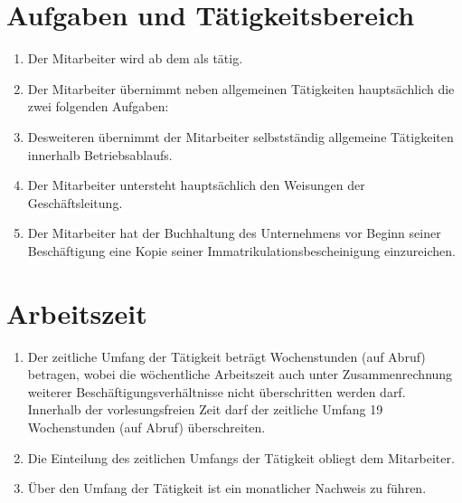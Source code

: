\documentclass[twoside,a4paper]{scrreprt}
\begin{document}
\newpage
\section{Aufgaben und Tätigkeitsbereich}
    \centerline{\textbf{}}
    
    \centerline{ }
    \begin{enumerate}[label=(\alph*)]
    	\item Der Mitarbeiter wird ab dem \Beginn \white als \Stellenbezeichnung \white tätig.
    	\item Der Mitarbeiter übernimmt neben allgemeinen Tätigkeiten hauptsächlich die zwei folgenden Aufgaben:
    	\Aufgabe
    	\item Desweiteren übernimmt der Mitarbeiter selbstständig allgemeine Tätigkeiten innerhalb Betriebsablaufs.
    	\item Der Mitarbeiter untersteht hauptsächlich den Weisungen der Geschäftsleitung.
    	\ifdefined\istStudent \item Der Mitarbeiter hat der Buchhaltung des Unternehmens vor Beginn seiner Beschäftigung eine Kopie seiner Immatrikulationsbescheinigung einzureichen.
    	\fi
    \end{enumerate}
    
\newpage      
\section{Arbeitszeit}
    
    \centerline{ }
    \begin{enumerate}[label=(\alph*)]
    	\ifdefined\stundenbasis\item Der zeitliche Umfang der Tätigkeit beträgt \Stunden Wochenstunden (auf Abruf) betragen, wobei die wöchentliche Arbeitszeit auch unter Zusammenrechnung weiterer Beschäftigungsverhältnisse nicht überschritten werden darf. Innerhalb der vorlesungsfreien Zeit darf der zeitliche Umfang 19 Wochenstunden (auf Abruf) überschreiten.
    	\fi
    	\ifdefined\pauschal
    	\item Die Einteilung des zeitlichen Umfangs der Tätigkeit obliegt dem Mitarbeiter.
    	\fi
    	\item Über den Umfang der Tätigkeit ist ein monatlicher Nachweis zu führen.
    \end{enumerate}
\end{document}
